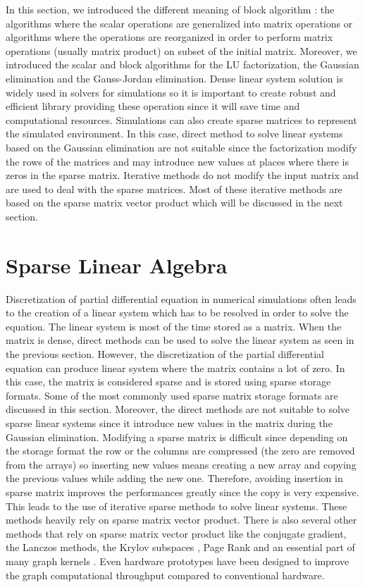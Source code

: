 In this section, we introduced the different meaning of block algorithm : the algorithms where the scalar operations are generalized into matrix operations or algorithms where the operations are reorganized in order to perform matrix operations (usually matrix product) on subset of the initial matrix.
Moreover, we introduced the scalar and block algorithms for the LU factorization, the Gaussian elimination and the Gauss-Jordan elimination.
Dense linear system solution is widely used in solvers for simulations so it is important to create robust and efficient library providing these operation since it will save time and computational resources.
Simulations can also create sparse matrices to represent the simulated environment.
In this case, direct method to solve linear systems based on the Gaussian elimination are not suitable since the factorization modify the rows of the matrices and may introduce new values at places where there is zeros in the sparse matrix.
Iterative methods do not modify the input matrix and are used to deal with the sparse matrices.
Most of these iterative methods are based on the sparse matrix vector product which will be discussed in the next section.


\section{Sparse Linear Algebra}

Discretization of partial differential equation in numerical simulations often leads to the creation of a linear system which has to be resolved in order to solve the equation.
The linear system is most of the time stored as a matrix.
When the matrix is dense, direct methods can be used to solve the linear system as seen in the previous section.
However, the discretization of the partial differential equation can produce linear system where the matrix contains a lot of zero.
In this case, the matrix is considered sparse and is stored using sparse storage formats.
Some of the most commonly used sparse matrix storage formats are discussed in this section.
Moreover, the direct methods are not suitable to solve sparse linear systems since it introduce new values in the matrix during the Gaussian elimination.
Modifying a sparse matrix is difficult since depending on the storage format the row or the columns are compressed (the zero are removed from the arrays) so inserting new values means creating a new array and copying the previous values while adding the new one.
Therefore, avoiding insertion in sparse matrix improves the performances greatly since the copy is very expensive.
This leads to the use of iterative sparse methods to solve linear systems.
These methods heavily rely on sparse matrix vector product.
There is also several other methods that rely on sparse matrix vector product like the conjugate gradient, the Lanczos methods, the Krylov subspaces \cite{Saad1989} \cite{Saad2003}, Page Rank \cite{RidiS2002} and an essential part of many graph kernels \cite{KepnG2011}.
Even hardware prototypes \cite{SoGLK2016} have been designed to improve the graph computational throughput compared to conventional hardware.


